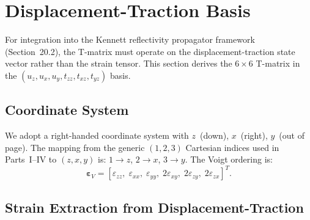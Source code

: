 \section{Displacement-Traction Basis}

For integration into the Kennett reflectivity propagator framework
(Section~20.2), the T-matrix must operate on the displacement-traction
state vector rather than the strain tensor.  This section derives the
$6\times 6$ T-matrix in the
$(u_z, u_x, u_y, t_{zz}, t_{xz}, t_{yz})$ basis.

\subsection{Coordinate System}

We adopt a right-handed coordinate system with $z$~(down), $x$~(right),
$y$~(out of page).  The mapping from the generic $(1,2,3)$ Cartesian indices
used in Parts~I--IV to $(z,x,y)$ is: $1\to z$, $2\to x$, $3\to y$.  The
Voigt ordering is:
\begin{equation}
  \boldsymbol{\varepsilon}_V
  = [\varepsilon_{zz},\;\varepsilon_{xx},\;\varepsilon_{yy},\;
     2\varepsilon_{xy},\;2\varepsilon_{zy},\;2\varepsilon_{zx}]^T.
\end{equation}

\subsection{Strain Extraction from Displacement-Traction}

